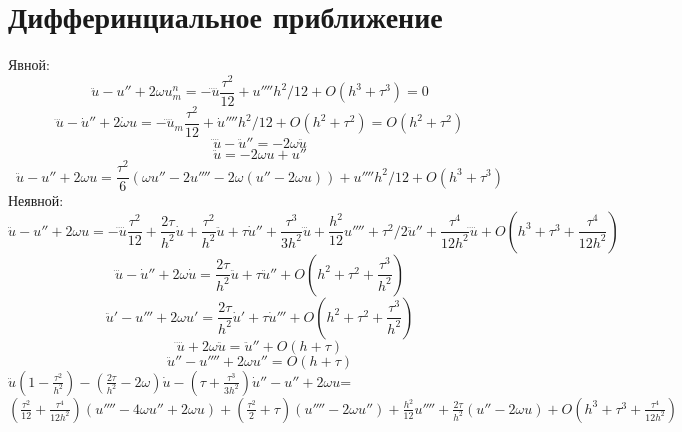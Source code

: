 \documentclass[12pt,eqnleft,executivepaper]{article}
\begin{document}
\section{Дифферинциальное приближение}Явной:
$$\ddot u-u''+2\omega u_m^n=-\ddddot u\frac{\tau^2}{12}+u''''h^2/12+O(h^3+\tau^3)=0$$
$$\dddot u-\dot u''+2\dot \omega u=-\ddddot u_m \frac{\tau^2}{12}+\dot u''''h^2/12+O(h^2+\tau^2)=O(h^2+\tau^2)$$
$$\ddddot u-\ddot u''=-2\omega \ddot  u $$
$$\ddot u=-2 \omega u+ u'' $$
$$\ddot u-u''+2\omega u=\frac{\tau^2}{6}(\omega u''-2u''''-2\omega(u''-2\omega u))+u''''h^2/12+ O(h^3+\tau^3)$$
Неявной:
$$\ddot u-u''+2\omega u=-\ddddot u \frac{\tau^2}{12}+\frac{2\tau}{h^2}\dot u+ \frac{\tau^2}{h^2}\ddot u+\tau \dot u'' + \frac{\tau^3}{3h^2} \dddot u+\frac{h^2}{12}u''''+\tau^2/2 \ddot u''+  \frac{\tau^4}{12h^2}\ddddot u +O(h^3+\tau^3+ \frac{\tau^4}{12h^2})$$
$$\dddot u-\dot u''+2\omega \dot u=\frac{2\tau}{h^2}\ddot u+\tau \ddot u'' +O(h^2+\tau^2+ \frac{\tau^3}{h^2})$$
$$\ddot u'-u'''+2\omega u'=\frac{2\tau}{h^2}\dot u'+\tau \dot u'''+O(h^2+\tau^2+ \frac{\tau^3}{h^2})$$
$$\ddddot u+2\omega \ddot u=\ddot u''+O(h+\tau)$$
$$\ddot u''-u''''+2\omega u''=O(h+\tau)$$
$\ddot u(1-\frac{\tau^2}{h^2})-(\frac{2\tau}{h^2}-2\omega)\dot u-(\tau+\frac{\tau^3}{3h^2})\dot u''-u''+2\omega u$=\\$ (\frac{\tau^2}{12}+\frac{\tau^4}{12h^2})(u''''-4\omega u''+2\omega u)+(\frac{\tau^2}{2}+\tau)(u''''-2\omega u'')+\frac{h^2}{12}u''''+\frac{2\tau}{h^2}(u''-2 \omega u)+O(h^3+\tau^3+ \frac{\tau^4}{12h^2})$
\end{document}
